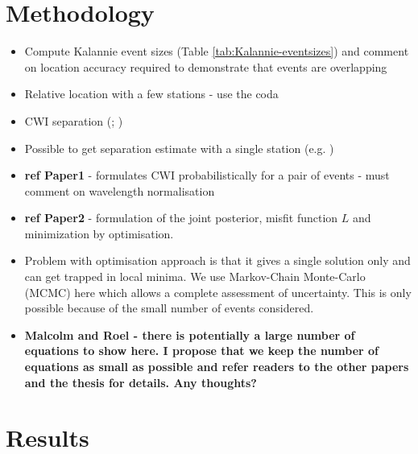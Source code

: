 \documentclass[grl]{agutex}
\begin{document}
\begin{article}
\section{Methodology}
\begin{itemize}
\item Compute Kalannie event sizes (Table \ref{tab:Kalannie-eventsizes}) and comment on location
accuracy required to demonstrate that events are overlapping
\item Relative location with a few stations - use the coda
\item CWI separation (\citealp{dr_Snieder05a}; \citealp{dr_Snieder06a})
\item Possible to get separation estimate with a single station (e.g. \citealp{dr_Robinson07b})
\item \textbf{ref Paper1} - formulates CWI probabilistically for a pair of events - must comment on wavelength normalisation
\item \textbf{ref Paper2} - formulation of the joint posterior, misfit function $L$ and minimization by optimisation.
\item Problem with optimisation approach is that it gives a single solution only and can get trapped in
local minima. We use Markov-Chain Monte-Carlo (MCMC) here which allows a complete assessment of uncertainty.
This is only possible because of the small number of events considered.
\item \textbf{Malcolm and Roel - there is potentially a large number of equations to show here. I propose that we keep
the number of equations as small as possible and refer readers to the other papers and the thesis for details. Any
thoughts?}
\end{itemize}


\section{Results}


\end{article}
\end{document}
